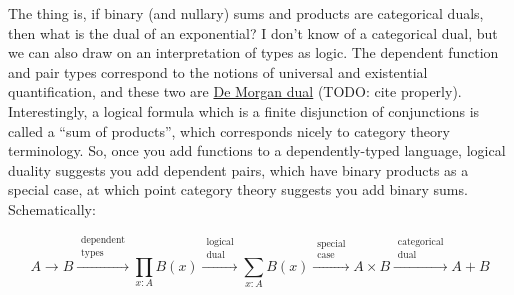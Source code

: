\documentclass[11pt]{article} %
\theoremstyle{definition}
\theoremstyle{remark}
\begin{document}
The thing is, if binary (and nullary) sums and products are categorical duals, then what is the dual of an exponential?
I don't know of a categorical dual, but we can also draw on an interpretation of types as logic.
The dependent function and pair types correspond to the notions of universal and existential quantification, and these two are \href{https://ncatlab.org/nlab/show/De+Morgan+duality}{De Morgan dual} (TODO: cite properly).
Interestingly, a logical formula which is a finite disjunction of conjunctions is called a ``sum of products'', which corresponds nicely to category theory terminology.
So, once you add functions to a dependently-typed language, logical duality suggests you add dependent pairs, which have binary products as a special case, at which point category theory suggests you add binary sums.
Schematically:

$$
  A \to B
  \xrightarrow{\substack{\text{dependent} \\ \text{types}}} \prod_{x:A}B(x)
  \xrightarrow{\substack{\text{logical} \\ \text{dual}}} \sum_{x:A}B(x)
  \xrightarrow{\substack{\text{special} \\ \text{case}}} A \times B
  \xrightarrow{\substack{\text{categorical} \\ \text{dual}}} A + B
$$
\end{document}
